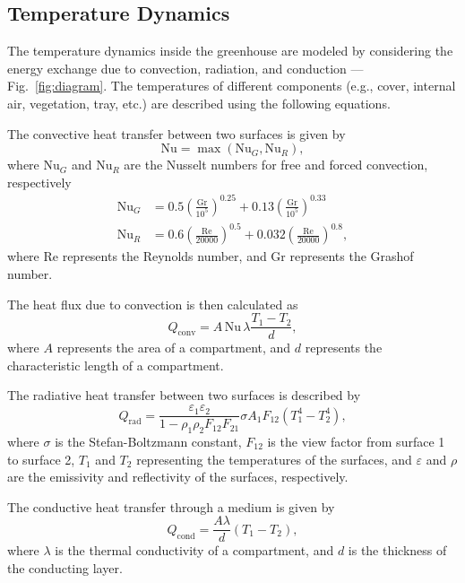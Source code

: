 \documentclass[conference]{IEEEtran}
\begin{document}
\subsection{Temperature Dynamics}\label{subsec:temperature}

The temperature dynamics inside the greenhouse are modeled by considering the energy exchange due to convection, radiation, and conduction --- Fig.~\ref{fig:diagram}. The temperatures of different components (e.g., cover, internal air, vegetation, tray, etc.) are described using the following equations.

The convective heat transfer between two surfaces is given by
\begin{equation}
    \text{Nu} = \max \left( \text{Nu}_G, \text{Nu}_R \right),
\end{equation}
where \(\text{Nu}_G\) and \(\text{Nu}_R\) are the Nusselt numbers for free and forced convection, respectively
\begin{align}
    \text{Nu}_G & = 0.5  {\left( \frac{\text{Gr}}{10^5} \right)}^{0.25} + 0.13  {\left(\frac{\text{Gr}}{10^5}\right)}^{0.33} \\
    \text{Nu}_R & = 0.6  {\left(\frac{\text{Re}}{20000}\right)}^{0.5} + 0.032  {\left(\frac{\text{Re}}{20000}\right)}^{0.8},
\end{align}
where Re represents the Reynolds number, and Gr represents the Grashof number.

The heat flux due to convection is then calculated as
\begin{equation}
    Q_{\text{conv}} = A\, \text{Nu}\, \lambda \frac{T_1 - T_2}{d},
\end{equation}
where \(A\) represents the area of a compartment, and \(d\) represents the characteristic length of a compartment.

The radiative heat transfer between two surfaces is described by
\begin{equation}
    Q_{\text{rad}} = \frac{\varepsilon_1  \varepsilon_2}{1 - \rho_1  \rho_2  F_{12}  F_{21}}  \sigma  A_1  F_{12}  \left( T_1^4 - T_2^4 \right),
\end{equation}
where \(\sigma \) is the Stefan-Boltzmann constant, \(F_{12}\) is the view factor from surface 1 to surface 2, \(T_1\) and \(T_2\) representing the temperatures of the surfaces, and \(\varepsilon \) and \(\rho \) are the emissivity and reflectivity of the surfaces, respectively.

The conductive heat transfer through a medium is given by
\begin{equation}
    Q_{\text{cond}} = \frac{A \lambda}{d} (T_1 - T_2),
\end{equation}
where \(\lambda \) is the thermal conductivity of a compartment, and
\(d\) is the thickness of the conducting layer.
\end{document}
